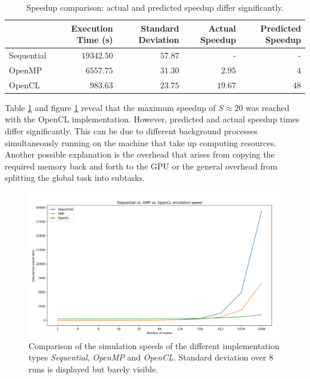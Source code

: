 \documentclass[a4paper,11pt]{scrartcl} %
\begin{document}
\renewcommand{\arraystretch}{1.3}
\begin{table}[h!]
  \begin{tabular}{l|rrrr}
    & Execution Time (s) & Standard Deviation &  Actual Speedup & Predicted Speedup \\ \hline
    Sequential & $19342.50$ & $57.87$ & - & -\\
    OpenMP & $6557.75$ & $31.30$ & $2.95$ & $4$\\
    OpenCL & $983.63$ & $23.75$ & $19.67$ & $48$
  \end{tabular}  
  \caption{Speedup comparison: actual and predicted speedup differ significantly.}
  \label{table:speedup}
\end{table}

Table \ref{table:speedup} and figure \ref{fig:benchmark_compare} reveal that the maximum speedup of $S\approx 20$ was reached with the OpenCL implementation. However, predicted and actual speedup times differ significantly. This can be due to different background processes simultaneously running on the machine that take up computing resources. Another possible explanation is the overhead that arises from copying the required memory back and forth to the GPU or the general overhead from splitting the global task into subtasks.
\begin{figure}[h!]
  \centering
  \includegraphics[width=\textwidth]{img/benchmark_compare.png}
  \caption{Comparison of the simulation speeds of the different implementation types \textit{Sequential}, \textit{OpenMP} and \textit{OpenCL}. Standard deviation over 8 runs is displayed but barely visible.}
  \label{fig:benchmark_compare}
\end{figure}
\end{document}
